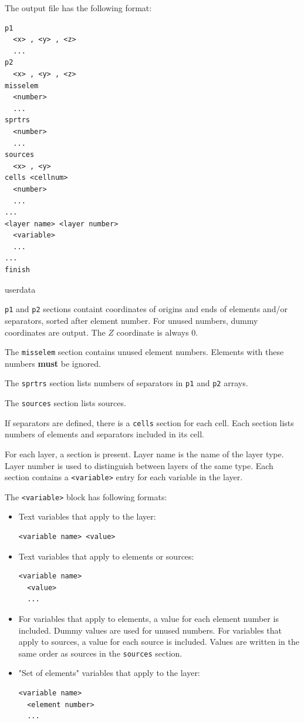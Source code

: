 \documentclass[a4paper,10pt]{report}
\begin{document}
The output file has the following format:

\begin{verbatim}
p1
  <x> , <y> , <z>
  ...
p2
  <x> , <y> , <z>
misselem
  <number>
  ...
sprtrs
  <number>
  ...
sources
  <x> , <y>
cells <cellnum>
  <number>
  ...
...
<layer name> <layer number>
  <variable>
  ...
...
finish
\end{verbatim}userdata

{\tt p1} and {\tt p2} sections containt coordinates of origins and
ends of elements and/or separators, sorted after element number. For
unused numbers, dummy coordinates are output. The $Z$ coordinate is
always 0.

The {\tt misselem} section contains unused element numbers. Elements
with these numbers {\bf must} be ignored.

The {\tt sprtrs} section lists numbers of separators in {\tt p1} and
{\tt p2} arrays.

The {\tt sources} section lists sources.

If separators are defined, there is a {\tt cells} section for each
cell. Each section lists numbers of elements and separators included
in its cell.

For each layer, a {\tt <layer name>} {\tt <layer number>} section is
present. Layer name is the name of the layer type. Layer number is
used to distinguish between layers of the same type. Each section
contains a {\tt <variable>} entry for each variable in the layer.

The {\tt <variable>} block has following formats:
\begin{itemize}
  \item Text variables that apply to the layer:
\begin{verbatim}
<variable name> <value>
\end{verbatim}
  \item Text variables that apply to elements or sources:
\begin{verbatim}
<variable name>
  <value>
  ...
\end{verbatim}
  \item For variables that apply to elements, a value for each element number
is included. Dummy values are used for unused numbers. For variables
that apply to sources, a value for each source is included. Values are
written in the same order as sources in the {\tt sources} section.
  \item "Set of elements" variables that apply to the layer:
\begin{verbatim}
<variable name>
  <element number>
  ...
\end{verbatim}
\end{itemize}
\end{document}
